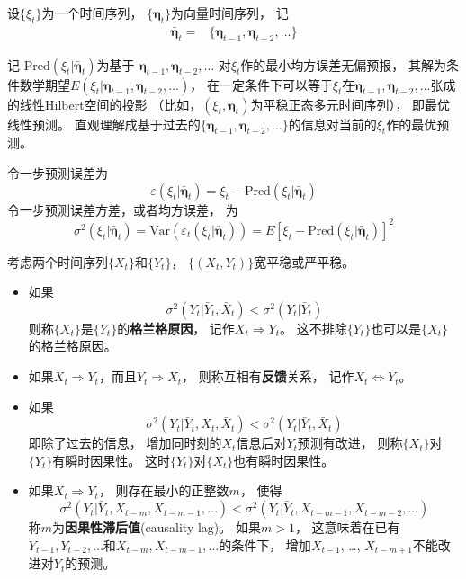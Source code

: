\documentclass[
]{book}
\providecommand{\tightlist}{%
  \setlength{\itemsep}{0pt}\setlength{\parskip}{0pt}}
\theoremstyle{definition}
\theoremstyle{definition}
\theoremstyle{definition}
\theoremstyle{definition}
\theoremstyle{remark}
\begin{document}
设\(\{ \xi_t \}\)为一个时间序列，
\(\{ \boldsymbol{\eta}_t \}\)为向量时间序列，
记
\[\begin{aligned}
\bar{\boldsymbol{\eta}}_t =& \{ \boldsymbol{\eta}_{t-1}, \boldsymbol{\eta}_{t-2}, \dots \} 
\end{aligned}\]

记
\(\text{Pred}(\xi_t | \bar{\boldsymbol{\eta}}_t)\)为基于
\(\boldsymbol{\eta}_{t-1}, \boldsymbol{\eta}_{t-2}, \dots\)
对\(\xi_t\)作的最小均方误差无偏预报，
其解为条件数学期望\(E(\xi_t | \boldsymbol{\eta}_{t-1}, \boldsymbol{\eta}_{t-2}, \dots)\)，
在一定条件下可以等于\(\xi_t\)在\(\boldsymbol{\eta}_{t-1}, \boldsymbol{\eta}_{t-2}, \dots\)张成的线性Hilbert空间的投影
（比如，\((\xi_t, \boldsymbol{\eta}_t)\)为平稳正态多元时间序列），
即最优线性预测。
直观理解成基于过去的\(\{\boldsymbol{\eta}_{t-1}, \boldsymbol{\eta}_{t-2}, \dots \}\)的信息对当前的\(\xi_t\)作的最优预测。

令一步预测误差为
\[
  \varepsilon(\xi_t | \bar{\boldsymbol{\eta}}_t) 
  = \xi_t - \text{Pred}(\xi_t | \bar{\boldsymbol{\eta}}_t)
\]
令一步预测误差方差，或者均方误差，
为
\[
  \sigma^2(\xi_t | \bar{\boldsymbol{\eta}}_t)  
  = \text{Var}(\varepsilon_t(\xi_t | \bar{\boldsymbol{\eta}}_t) )
  = E \left[ \xi_t - \text{Pred}(\xi_t | \bar{\boldsymbol{\eta}}_t) \right]^2
\]

考虑两个时间序列\(\{ X_t \}\)和\(\{ Y_t \}\)，
\(\{(X_t, Y_t) \}\)宽平稳或严平稳。

\begin{itemize}
\tightlist
\item
  如果
  \[
  \sigma^2(Y_t | \bar Y_t, \bar X_t) < \sigma^2(Y_t | \bar Y_t)
  \]
  则称\(\{ X_t \}\)是\(\{ Y_t \}\)的\textbf{格兰格原因}，
  记作\(X_t \Rightarrow Y_t\)。
  这不排除\(\{ Y_t \}\)也可以是\(\{ X_t \}\)的格兰格原因。
\item
  如果\(X_t \Rightarrow Y_t\)，而且\(Y_t \Rightarrow X_t\)，
  则称互相有\textbf{反馈}关系，
  记作\(X_t \Leftrightarrow Y_t\)。
\item
  如果
  \[
  \sigma^2(Y_t | \bar Y_t, X_t, \bar X_t) < \sigma^2(Y_t | \bar Y_t, \bar X_t)
  \]
  即除了过去的信息，
  增加同时刻的\(X_t\)信息后对\(Y_t\)预测有改进，
  则称\(\{X_t \}\)对\(\{Y_t \}\)有瞬时因果性。
  这时\(\{Y_t \}\)对\(\{X_t \}\)也有瞬时因果性。
\item
  如果\(X_t \Rightarrow Y_t\)，
  则存在最小的正整数\(m\)，
  使得
  \[
  \sigma^2(Y_t | \bar Y_t, X_{t-m}, X_{t-m-1}, \dots) 
  < \sigma^2(Y_t | \bar Y_t, X_{t-m-1}, X_{t-m-2}, \dots) 
  \]
  称\(m\)为\textbf{因果性滞后值}(causality lag)。
  如果\(m>1\)，
  这意味着在已有\(Y_{t-1}, Y_{t-2}, \dots\)和\(X_{t-m}, X_{t-m-1}, \dots\)的条件下，
  增加\(X_{t-1}\), \dots, \(X_{t-m+1}\)不能改进对\(Y_t\)的预测。
\end{itemize}
\end{document}
